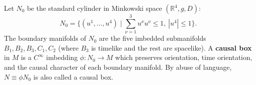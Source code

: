 Let $N_0$ be the standard cylinder in Minkowski space $(\mathbb{R}^4, g, D)$:
$$N_0 = \{(u^1, \ldots, u^4) \mid \sum_{\nu=1}^{3} u^\nu u^\nu \leq 1,\ |u^4| \leq 1\}.$$
The boundary manifolds of $N_0$ are the five imbedded submanifolds $B_1, B_2, B_3, C_1, C_2$ (where $B_3$ is timelike and the rest are spacelike). A \textbf{causal box} in $M$ is a $C^\infty$ imbedding $\phi: N_0 \rightarrow M$ which preserves orientation, time orientation, and the causal character of each boundary manifold. By abuse of language, $N \equiv \phi N_0$ is also called a causal box.
